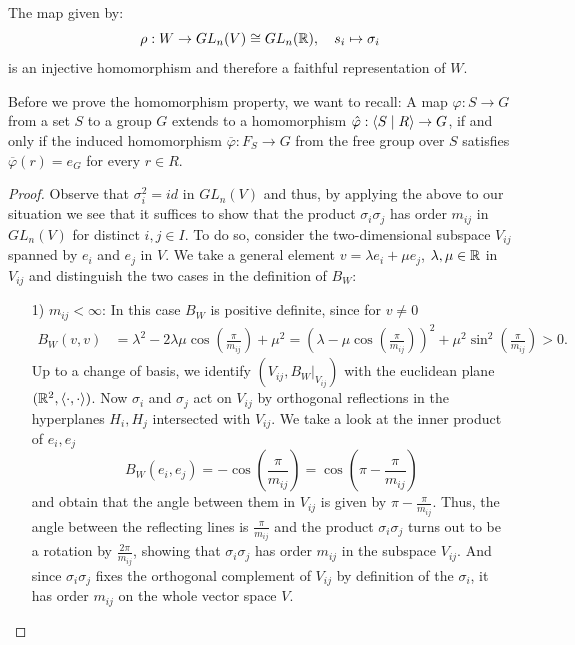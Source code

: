 \begin{theorem}\label{thm:repr}
    The map given by:
    \[\rho : W \to GL_n(V) \cong GL_n(\mathbb{R}), \quad s_i \mapsto \sigma_i\]
    is an injective homomorphism and therefore a faithful representation of \(W\).
\end{theorem}
Before we prove the homomorphism property, we want to recall:
A map \(\varphi: S\to G\) from a set \(S\) to a group \(G\) extends to a homomorphism \(\Hat{\varphi}:\langle S\;\vert\;R\rangle\to G\), if and only if the induced homomorphism \(\overline{\varphi}:F_S \to G\) from the free group over \(S\) satisfies \(\overline{\varphi}(r) = e_G\) for every \(r\in R\).
\begin{proof}
    Observe that \(\sigma_i^2 = id\) in \(GL_n(V)\) and thus, by applying the above to our situation we see that it suffices to show that the product \(\sigma_i\sigma_j\) has order \(m_{ij}\) in \(GL_n(V)\) for distinct \(i,j\in I\).
    To do so, consider the two-dimensional subspace \(V_{ij}\) spanned by \(e_i\) and \(e_j\) in \(V\).
    We take a general element \(v = \lambda e_i + \mu e_j\), \(\lambda,\mu\in\mathbb{R}\) in \(V_{ij}\) and distinguish the two cases in the definition of \(B_W\):
    \begin{itemize}
        \item[1)] \(m_{ij}<\infty\): In this case \(B_W\) is positive definite, since for \(v\neq 0\)
              \begin{align*}
                  B_W(v,v) & = \lambda^2 - 2\lambda\mu\cos\left(\frac{\pi}{m_{ij}}\right) + \mu^2
                  = \left( \lambda - \mu\cos\left( \frac{\pi}{m_{ij}} \right) \right)^2 + \mu^2\sin^2\left( \frac{\pi}{m_{ij}} \right) > 0.
              \end{align*}
              Up to a change of basis, we identify \((V_{ij}, B_W\vert_{V_{ij}})\) with the euclidean plane \((\mathbb{R}^2, \langle\cdot, \cdot\rangle)\).
              Now \(\sigma_i\) and \(\sigma_j\) act on \(V_{ij}\) by orthogonal reflections in the hyperplanes \(H_i, H_j\) intersected with \(V_{ij}\).
              We take a look at the inner product of \(e_i, e_j\)
              \[B_W(e_i, e_j) = -\cos\left(\frac{\pi}{m_{ij}}\right) = \cos\left(\pi - \frac{\pi}{m_{ij}}\right)\]
              and obtain that the angle between them in \(V_{ij}\) is given by \(\pi - \frac{\pi}{m_{ij}}\).
              Thus, the angle between the reflecting lines is \(\frac{\pi}{m_{ij}}\) and the product \(\sigma_i\sigma_j\) turns out to be a rotation by \(\frac{2\pi}{m_{ij}}\), showing that \(\sigma_i\sigma_j\) has order \(m_{ij}\) in the subspace \(V_{ij}\).
              And since \(\sigma_i\sigma_j\) fixes the orthogonal complement of \(V_{ij}\) by definition of the \(\sigma_i\), it has order \(m_{ij}\) on the whole vector space \(V\).


\end{itemize}
\end{proof}
